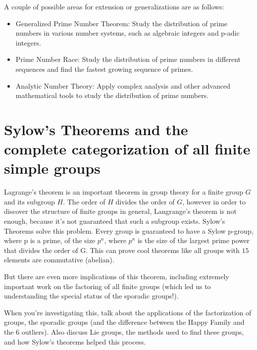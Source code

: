 \documentclass{article}
\begin{document}
    \vspace{3mm}
    A couple of possible areas for extension or generalizations are as follows:
    \begin{itemize}
        \item Generalized Prime Number Theorem: Study the distribution of prime numbers in various number systems, such as algebraic integers and p-adic integers.
    
        \item Prime Number Race: Study the distribution of prime numbers in different sequences and find the fastest growing sequence of primes.
        
        \item Analytic Number Theory: Apply complex analysis and other advanced mathematical tools to study the distribution of prime numbers.
    \end{itemize}
    
\pagebreak

\section{Sylow's Theorems and the complete categorization of all finite simple groups}
    
    Lagrange's theorem is an important theorem in group theory for a finite group $G$ and its subgroup $H$. The order of $H$ divides the order of $G$, however in order to discover the structure of finite groups in general, Langrange's theorem is not enough, because it's not guaranteed that such a subgroup exists. Sylow's Theorems solve this problem. Every group is guaranteed to have a Sylow p-group, where p is a prime, of the size $p^n$, where $p^n$ is the size of the largest prime power that divides the order of G. This can prove cool theorems like all groups with $15$ elements are commutative (abelian).
    
    But there are even more implications of this theorem, including extremely important work on the factoring of all finite groups (which led us to understanding the special status of the sporadic groups!).

    When you're investigating this, talk about the applications of the factorization of groups, the sporadic groups (and the difference between the Happy Family and the 6 outliers).
    Also discuss Lie groups, the methods used to find these groups, and how Sylow's theorems helped this process.

\pagebreak
\end{document}
